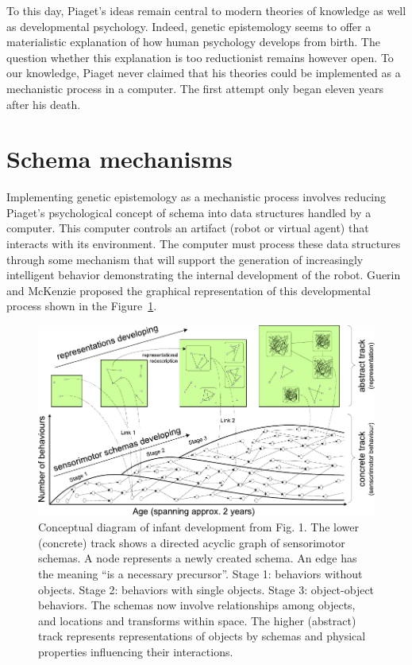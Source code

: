 \documentclass[runningheads]{llncs}
\begin{document}
To this day, Piaget's ideas remain central to modern theories of knowledge as well as developmental psychology. 
Indeed, genetic epistemology seems to offer a materialistic explanation of how human psychology develops from birth.
The question whether this explanation is too reductionist remains however open. 
To our knowledge, Piaget never claimed that his theories could be implemented as a mechanistic process in a computer. 
The first attempt only began eleven years after his death.

\cite{chaput_constructivist_2004}
\cite{guerin_piagetian_2008}
\cite{miller_building_2018}

%
\section{Schema mechanisms}
\label{sec:schema}
%
Implementing genetic epistemology as a mechanistic process involves reducing Piaget's psychological concept of schema into data structures handled by a computer. 
This computer controls an artifact (robot or virtual agent) that interacts with its environment.
The computer must process these data structures through some mechanism that will support the generation of increasingly intelligent behavior demonstrating the internal development of the robot.
Guerin and McKenzie \cite{guerin_survey_2013} proposed the graphical representation of this developmental process shown in the Figure~\ref{fig:general}.
%
\begin{figure}
	\includegraphics[width=\textwidth]{Figure_1_guerin.pdf}
	\caption{Conceptual diagram of infant development from \cite{guerin_survey_2013} Fig. 1.
	The lower (concrete) track shows a directed acyclic graph of sensorimotor schemas. 
	A node represents a newly created schema. 
	An edge has the meaning ``is a necessary precursor''. 
    Stage 1: behaviors without objects. 
    Stage 2: behaviors with single objects. 
    Stage 3: object-object behaviors. The schemas now involve relationships among objects, and locations and transforms within space.
    The higher (abstract) track represents representations of objects by schemas and physical properties influencing their interactions.} 
	\label{fig:general}
\end{figure}
\end{document}
